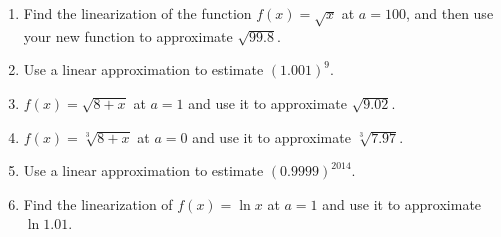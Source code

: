 \begin{enumerate}[ref={\fcProblemRef}]
\item Find the linearization of the function $f(x) = \sqrt{x}$ at $a = 100$, and then use your new function to approximate
$\sqrt{99.8}$.


\item Use a linear approximation to estimate $(1.001)^9$. 


\item $f(x)=\sqrt{8+x}$ at $a=1$ and use it to approximate $\sqrt{9.02}$.

\item $f(x)=\sqrt[3]{8+x}$ at $a=0$ and use it to approximate $\sqrt[3] {7.97}$.


\item \label{problem-linearization-estimate0.9999power2014} Use a linear approximation to estimate $(0.9999)^{2014}$. 


\item Find the linearization of $f(x)=\ln x$ at $a=1$ and use it to approximate $\ln 1.01$.


\end{enumerate}
